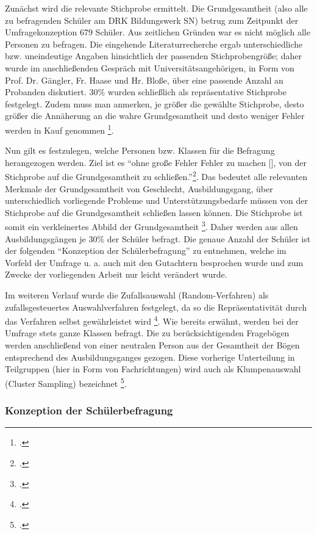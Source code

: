 \noindent
Zunächst wird die relevante Stichprobe ermittelt. Die Grundgesamtheit (also alle zu befragenden Schüler am DRK Bildungswerk SN) betrug zum Zeitpunkt der Umfragekonzeption 679 Schüler. Aus zeitlichen Gründen war es nicht möglich alle Personen zu befragen. Die eingehende Literaturrecherche ergab unterschiedliche bzw. uneindeutige Angaben hinsichtlich der passenden Stichprobengröße; daher wurde im anschließenden Gespräch mit Universitätsangehörigen, in Form von Prof. Dr. Gängler, Fr. Haase und Hr. Bloße, über eine passende Anzahl an Probanden diskutiert. 30\% wurden schließlich als repräsentative Stichprobe festgelegt. Zudem muss man anmerken, je größer die gewählte Stichprobe, desto größer die Annäherung an die wahre Grundgesamtheit und desto weniger Fehler werden in Kauf genommen \footcite[vgl.][65f]{Mayer2013}. 

Nun gilt es festzulegen, welche Personen bzw. Klassen für die Befragung herangezogen werden. Ziel ist es "`ohne große Fehler Fehler zu machen [\punkte], von der Stichprobe auf die Grundgesamtheit zu schließen."'\footcite[60]{Mayer2013}. Das bedeutet alle relevanten Merkmale der Grundgesamtheit von Geschlecht, Ausbildungsgang, über unterschiedlich vorliegende Probleme und Unterstützungsbedarfe müssen von der Stichprobe auf die Grundgesamtheit schließen lassen können. Die Stichprobe ist somit ein verkleinertes Abbild der Grundgesamtheit \footcite [vgl.][197]{Kromrey1995}. Daher werden aus allen Ausbildungsgängen je 30\% der Schüler befragt. Die genaue Anzahl der Schüler ist der folgenden "`Konzeption der Schülerbefragung"' zu entnehmen, welche im Vorfeld der Umfrage u. a. auch mit den Gutachtern besprochen wurde und zum Zwecke der vorliegenden Arbeit nur leicht verändert wurde.

Im weiteren Verlauf wurde die Zufallsauswahl (Random-Verfahren) als zufallsgesteuertes Auswahlverfahren festgelegt, da so die Repräsentativität durch das Verfahren selbst gewährleistet wird \footcite[vgl.][60]{Mayer2013}. Wie bereits erwähnt, werden bei der Umfrage stets ganze Klassen befragt. Die zu berücksichtigenden Fragebögen werden anschließend von einer neutralen Person aus der Gesamtheit der Bögen entsprechend des Ausbildungsganges gezogen. Diese vorherige Unterteilung in Teilgruppen (hier in Form von Fachrichtungen) wird auch als Klumpenauswahl (Cluster Sampling) bezeichnet \footcite[vgl.][63]{Mayer2013}.

\subsubsection{Konzeption der Schülerbefragung}
\label{sec:KonzeptionDerSchülerbefragung}

